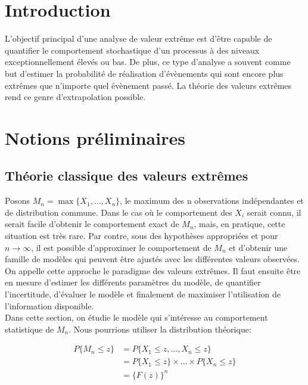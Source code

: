 \documentclass[11pt]{report}
\numberwithin{equation}{section}
\begin{document}
\chapter*{Introduction}
\label{chap:introduction} 

L'objectif principal d'une analyse de valeur extrême est d'être capable de quantifier le comportement stochastique d'un processus à des niveaux exceptionnellement élevés ou bas. De plus, ce type d'analyse a souvent comme but d'estimer la probabilité de réalisation d'évènements qui sont encore plus extrêmes que n'importe quel évènement passé. La théorie des valeurs extrêmes rend ce genre d'extrapolation possible.

\chapter{Notions préliminaires}
\label{chap:notions} 

\section{Théorie classique des valeurs extrêmes}

Posons $M_n = \max\{X_1, \dots, X_n\}$, le maximum des n observations indépendantes et de distribution commune. Dans le cas où le comportement des $X_i$ serait connu, il serait facile d'obtenir le comportement exact de $M_n$, mais, en pratique, cette situation est très rare. Par contre, sous des hypothèses appropriées et pour ${n \to \infty}$, il est possible d'approximer le comportement de $M_n$ et d'obtenir une famille de modèles qui peuvent être ajustés avec les différentes valeurs observées. On appelle cette approche le paradigme des valeurs extrêmes. Il faut ensuite être en mesure d'estimer les différents paramètres du modèle, de quantifier l'incertitude, d'évaluer le modèle et finalement de maximiser l'utilisation de l'information disponible.\\

Dans cette section, on étudie le modèle qui s'intéresse au comportement statistique de $M_n$. Nous pourrions utiliser la distribution théorique:

\begin{equation}\label{eq:1.1.1}
\begin{split}
P\{M_n \le z\} &= P\{X_1 \le z, \dots, X_n \le z\} \\
              &= P\{X_1 \le z\} \times \dots \times P\{X_n \le z\} \\
              &= \{F(z)\}^n
\end{split}
\end{equation}
\end{document}

